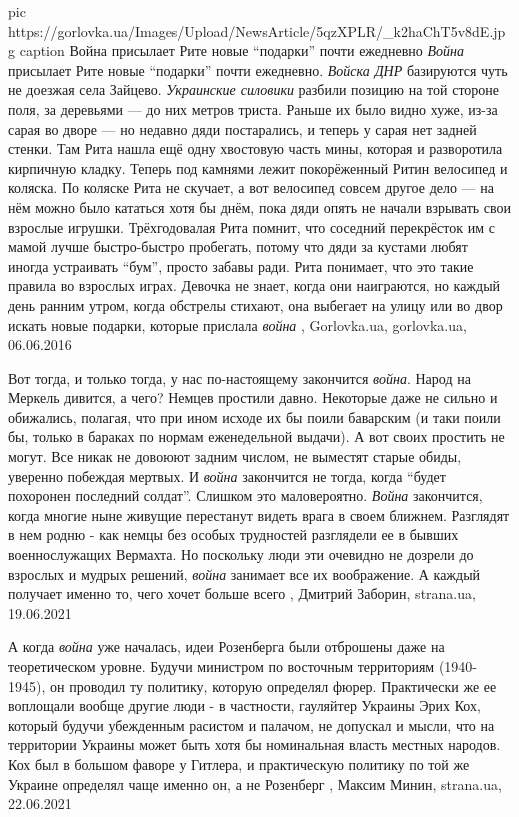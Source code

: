 \ifcmt
  pic https://gorlovka.ua/Images/Upload/NewsArticle/5qzXPLR/_k2haChT5v8dE.jpg
  caption Война присылает Рите новые \enquote{подарки} почти ежедневно
\fi
\emph{Война} присылает Рите новые \enquote{подарки} почти ежедневно. \emph{Войска ДНР} базируются
чуть не доезжая села Зайцево. \emph{Украинские силовики} разбили позицию на той
стороне поля, за деревьями — до них метров триста. Раньше их было видно хуже,
из-за сарая во дворе — но недавно дяди постарались, и теперь у сарая нет
задней стенки. Там Рита нашла ещё одну хвостовую часть мины, которая и
разворотила кирпичную кладку. Теперь под камнями лежит покорёженный Ритин
велосипед и коляска. По коляске Рита не скучает, а вот велосипед совсем другое
дело — на нём можно было кататься хотя бы днём, пока дяди опять не начали
взрывать свои взрослые игрушки. Трёхгодовалая Рита помнит, что соседний
перекрёсток им с мамой лучше быстро-быстро пробегать, потому что дяди за
кустами любят иногда устраивать \enquote{бум}, просто забавы ради. Рита понимает, что
это такие правила во взрослых играх. Девочка не знает, когда они наиграются,
но каждый день ранним утром, когда обстрелы стихают, она выбегает на улицу или
во двор искать новые подарки, которые прислала \emph{война}
, 
Gorlovka.ua, gorlovka.ua, 06.06.2016

Вот тогда, и только тогда, у нас по-настоящему закончится \emph{война}.
Народ на Меркель дивится, а чего? Немцев простили давно. Некоторые даже не
сильно и обижались, полагая, что при ином исходе их бы поили баварским (и таки
поили бы, только в бараках по нормам еженедельной выдачи). А вот своих простить
не могут. Все никак не довоюют задним числом, не выместят старые обиды,
уверенно побеждая мертвых.  И \emph{война} закончится не тогда, когда \enquote{будет похоронен
последний солдат}. Слишком это маловероятно. \emph{Война} закончится, когда многие
ныне живущие перестанут видеть врага в своем ближнем. Разглядят в нем родню -
как немцы без особых трудностей разглядели ее в бывших военнослужащих Вермахта.
Но поскольку люди эти очевидно не дозрели до взрослых и мудрых решений, \emph{война}
занимает все их воображение. А каждый получает именно то, чего хочет больше
всего
, 
Дмитрий Заборин, strana.ua, 19.06.2021

А когда \emph{война} уже началась, идеи Розенберга были отброшены даже на
теоретическом уровне. Будучи министром по восточным территориям (1940-1945), он
проводил ту политику, которую определял фюрер.  Практически же ее воплощали
вообще другие люди - в частности, гауляйтер Украины Эрих Кох, который будучи
убежденным расистом и палачом, не допускал и мысли, что на территории Украины
может быть хотя бы номинальная власть местных народов.  Кох был в большом
фаворе у Гитлера, и практическую политику по той же Украине определял чаще
именно он, а не Розенберг
, 
Максим Минин, strana.ua, 22.06.2021

